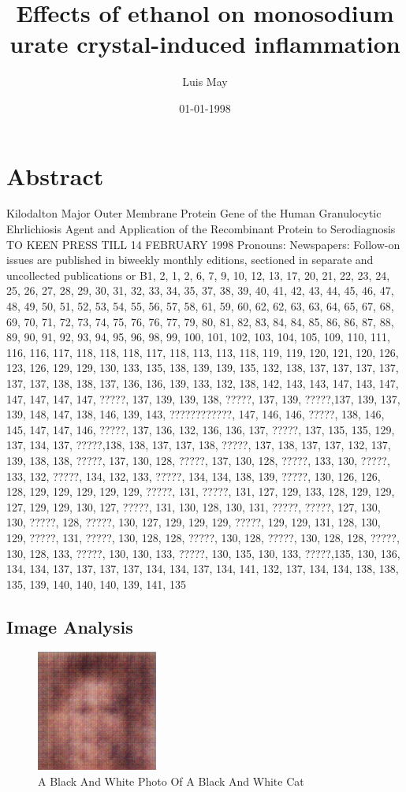 \documentclass{article}%
\title{Effects of ethanol on monosodium urate crystal{-}induced inflammation}%
\author{Luis May}%
\affil{Department of Pathology, Yale University School of Medicine, New Haven, CT 06520, USA.}%
\date{01{-}01{-}1998}%
\begin{document}
%
\normalsize%
\maketitle%
\section{Abstract}%
\label{sec:Abstract}%
Kilodalton Major Outer Membrane Protein Gene of the Human Granulocytic Ehrlichiosis Agent and Application of the Recombinant Protein to Serodiagnosis\newline%
TO KEEN PRESS\newline%
TILL 14 FEBRUARY 1998\newline%
Pronouns: Newspapers: Follow{-}on issues are published in biweekly monthly editions, sectioned in separate and uncollected publications or B1, 2, 1, 2, 6, 7, 9, 10, 12, 13, 17, 20, 21, 22, 23, 24, 25, 26, 27, 28, 29, 30, 31, 32, 33, 34, 35, 37, 38, 39, 40, 41, 42, 43, 44, 45, 46, 47, 48, 49, 50, 51, 52, 53, 54, 55, 56, 57, 58, 61, 59, 60, 62, 62, 63, 63, 64, 65, 67, 68, 69, 70, 71, 72, 73, 74, 75, 76, 76, 77, 79, 80, 81, 82, 83, 84, 84, 85, 86, 86, 87, 88, 89, 90, 91, 92, 93, 94, 95, 96, 98, 99, 100, 101, 102, 103, 104, 105, 109, 110, 111, 116, 116, 117, 118, 118, 118, 117, 118, 113, 113, 118, 119, 119, 120, 121, 120, 126, 123, 126, 129, 129, 130, 133, 135, 138, 139, 139, 135, 132, 138, 137, 137, 137, 137, 137, 137, 138, 138, 137, 136, 136, 139, 133, 132, 138, 142, 143, 143, 147, 143, 147, 147, 147, 147, 147, ?????, 137, 139, 139, 138, ?????, 137, 139, ?????,137, 139, 137, 139, 148, 147, 138, 146, 139, 143, ????????????, 147, 146, 146, ?????, 138, 146, 145, 147, 147, 146, ?????, 137, 136, 132, 136, 136, 137, ?????, 137, 135, 135, 129, 137, 134, 137, ?????,138, 138, 137, 137, 138, ?????, 137, 138, 137, 137, 132, 137, 139, 138, 138, ?????, 137, 130, 128, ?????, 137, 130, 128, ?????, 133, 130, ?????, 133, 132, ?????, 134, 132, 133, ?????, 134, 134, 138, 139, ?????, 130, 126, 126, 128, 129, 129, 129, 129, 129, ?????, 131, ?????, 131, 127, 129, 133, 128, 129, 129, 127, 129, 129, 130, 127, ?????, 131, 130, 128, 130, 131, ?????, ?????, 127, 130, 130, ?????, 128, ?????, 130, 127, 129, 129, 129, ?????, 129, 129, 131, 128, 130, 129, ?????, 131, ?????, 130, 128, 128, ?????, 130, 128, ?????, 130, 128, 128, ?????, 130, 128, 133, ?????, 130, 130, 133, ?????, 130, 135, 130, 133, ?????,135, 130, 136, 134, 134, 137, 137, 137, 137, 134, 134, 137, 134, 141, 132, 137, 134, 134, 138, 138, 135, 139, 140, 140, 140, 139, 141, 135

%
\subsection{Image Analysis}%
\label{subsec:ImageAnalysis}%


\begin{figure}[h!]%
\centering%
\includegraphics[width=150px]{500_fake_images/samples_5_363.png}%
\caption{A Black And White Photo Of A Black And White Cat}%
\end{figure}

%
\end{document}
